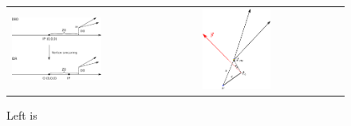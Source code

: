 \documentclass[preprint]{elsarticle}
\begin{document}
\begin{itemize}
    \begin{figure}[h!]
      \centering
        \begin{tabular}{ll}
          \includegraphics[width=0.5\textwidth]{figures_Methods/drawing.eps} & 
          \includegraphics[width=0.5\textwidth]{figures_Methods/vertex_recovery.eps}
        \end{tabular}
        \caption{Left is }
        \label{fig_vtx_restore_schematics}
    \end{figure}
          
  
\end{itemize}
\end{document}
